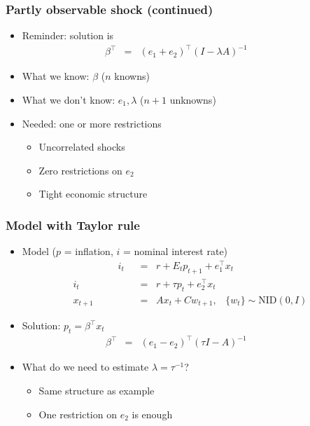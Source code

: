 \documentclass{beamer}
\begin{document}
\begin{frame}
\frametitle{Partly observable shock (continued)}
\begin{itemize}  \itemsep=\bigskipamount
\item Reminder:  solution is
\begin{eqnarray*}
     \beta^\top  &=&  (e_1+e_2)^\top (I-\lambda A)^{-1}
    \phantom{xxxxx}
\end{eqnarray*}
\item What we know:  $\beta$ ($n$ knowns)
\item What we don't know:  $e_1, \lambda$ ($n+1$ unknowns)
\item Needed:  one or more restrictions \\
\begin{itemize}
\item Uncorrelated shocks
\item Zero restrictions on $e_2$
\item Tight economic structure
\end{itemize}
\end{itemize}
\end{frame}

\begin{frame}
\frametitle{Model with Taylor rule}
\begin{itemize}  \itemsep=\bigskipamount
\item Model ($p$ = inflation, $i$ = nominal interest rate)
\begin{align*}
    \phantom{xxxxxxxx}
    i_t &\;\;=\;\;  r +  E_t p_{t+1} + e_1^\top x_t  \tag{Euler equation} \\
    i_t &\;\;=\;\;  r + \tau p_{t} +  e_2^\top x_{t} \tag{Taylor rule} \\
    x_{t+1} &\;\;=\;\; A x_{t} + C w_{t+1},
            \;\;\;\{ w_t \} \sim \mbox{NID}(0,I)
\end{align*}
\item Solution:  $ p_t = \beta^\top x_t $
\begin{eqnarray*}
    \beta^\top &=& (e_1 - e_2)^\top (\tau I - A)^{-1}
    \phantom{xxxxx}
\end{eqnarray*}
\item What do we need to estimate $\lambda = \tau^{-1}$?  \\
\begin{itemize}
\item Same structure as example
\item One restriction on $e_2$ is enough
\end{itemize}
\end{itemize}
\end{frame}
\end{document}
